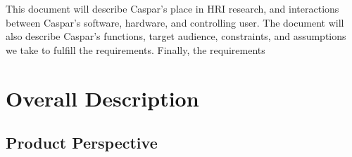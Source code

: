 \documentclass[onecolumn, draftclsnofoot,10pt, compsoc]{IEEEtran}
\begin{document}

This document will describe Caspar’s place in HRI research, and interactions between Caspar’s software, hardware, and controlling user. The document will also describe Caspar’s functions, target audience, constraints, and assumptions we take to fulfill the requirements. Finally, the requirements

\section{Overall Description}


\subsection{Product Perspective}


\end{document}
